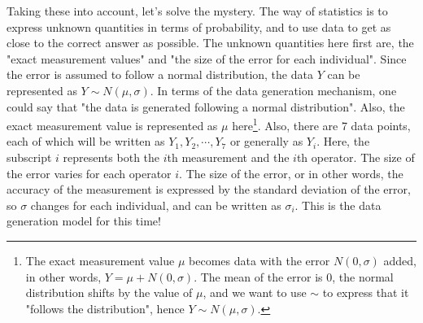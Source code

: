 \documentclass{ltjsbook}
\begin{document}
Taking these into account, let's solve the mystery. The way of statistics is to express unknown quantities in terms of probability, and to use data to get as close to the correct answer as possible.
The unknown quantities here first are, the "exact measurement values" and "the size of the error for each individual". Since the error is assumed to follow a normal distribution, the data $Y$ can be represented as $Y\sim N(\mu, \sigma)$. In terms of the data generation mechanism, one could say that "the data is generated following a normal distribution". Also, the exact measurement value is represented as $\mu$ here\footnote{ The exact measurement value $\mu$ becomes data with the error $N(0,\sigma)$ added, in other words, $Y=\mu+N(0,\sigma)$. The mean of the error is $0$, the normal distribution shifts by the value of $\mu$, and we want to use $\sim$ to express that it "follows the distribution", hence $Y\sim N(\mu,\sigma)$.}. Also, there are 7 data points, each of which will be written as $Y_1,Y_2,\cdots,Y_7$ or generally as $Y_i$. Here, the subscript $i$ represents both the $i$th measurement and the $i$th operator. The size of the error varies for each operator $i$. The size of the error, or in other words, the accuracy of the measurement is expressed by the standard deviation of the error, so $\sigma$ changes for each individual, and can be written as $\sigma_i$. This is the data generation model for this time!
\end{document}
